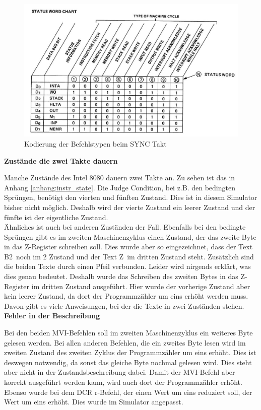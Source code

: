 \documentclass[12pt]{article}
\newcommand{\imgSpaceBefore}{\vspace{10pt}}
\begin{document}
\imgSpaceBefore
\begin{figure}[H]
\centering
\includegraphics[width=15cm]{Bilder/Intel8080_DataLines}
\caption{Kodierung der Befehlstypen beim SYNC Takt \cite{IntMan20}}
\label{fig:status_word}
\end{figure}

\noindent
\textbf{Zustände die zwei Takte dauern}

\noindent
Manche Zustände des Intel 8080 dauern zwei Takte an. Zu sehen ist das in Anhang \ref{anhang:instr_state}. Die Judge Condition, bei z.B. den bedingten Sprüngen, benötigt den vierten und fünften Zustand. Dies ist in diesem Simulator bisher nicht möglich. Deshalb 
wird der vierte Zustand ein leerer Zustand und der fünfte ist der eigentliche Zustand. 
\\

\noindent
Ähnliches ist auch bei anderen Zuständen der Fall. Ebenfalls bei den bedingte Sprüngen gibt es im zweiten Maschinenzyklus einen Zustand, der das zweite Byte in das Z-Register schreiben soll. Dies wurde aber so eingezeichnet, dass der Text \glqq B2\grqq\ noch im 2 Zustand und der Text \glqq Z\grqq\ im dritten Zustand steht. Zusätzlich sind die beiden Texte durch einen Pfeil verbunden. Leider wird nirgends erklärt, was dies genau bedeutet. Deshalb wurde das Schreiben des zweiten Bytes in das Z-Register im dritten Zustand ausgeführt. Hier wurde der vorherige Zustand aber kein leerer Zustand, da dort der Programmzähler um eins erhöht werden muss. Davon gibt es viele Anweisungen, bei der die Texte in zwei Zuständen stehen.
\\

\noindent
\textbf{Fehler in der Beschreibung}

\noindent
Bei den beiden MVI-Befehlen soll im zweiten Maschinenzyklus ein weiteres Byte gelesen werden. Bei allen anderen Befehlen, die ein zweites Byte lesen wird im zweiten Zustand des zweiten Zyklus der Programmzähler um eins erhöht. Dies ist deswegen notwendig, da sonst das gleiche Byte nochmal gelesen wird. Dies steht aber nicht in der Zustandsbeschreibung dabei. Damit der MVI-Befehl aber korrekt ausgeführt werden kann, wird auch dort der Programmzähler erhöht. Ebenso wurde bei dem DCR r-Befehl, der einen Wert um eins reduziert soll, der Wert um eins erhöht. Dies wurde im Simulator angepasst.
\\
\end{document}
